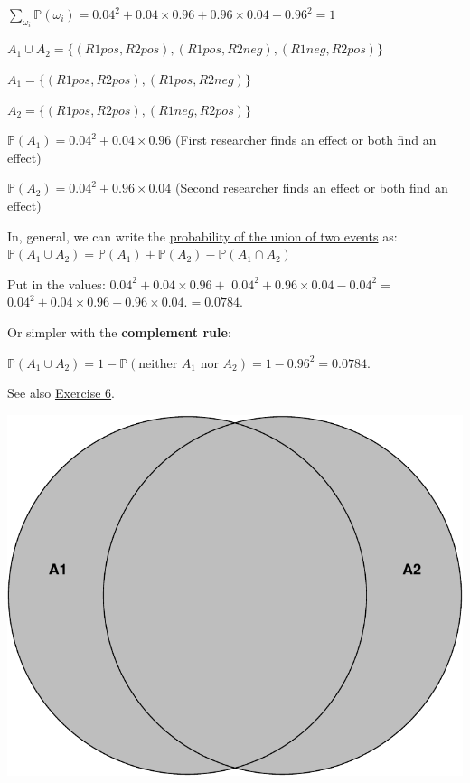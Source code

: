 \documentclass[
]{book}
\newcommand{\pandocbounded}[1]{#1}
\begin{document}
\(\sum_{\omega_i} \mathbb{P}(\omega_i) = 0.04^2 + 0.04 \times 0.96 + 0.96 \times 0.04 + 0.96^2 = 1\)

\(A_1 \cup A_2 = \{ (R1pos, R2pos), (R1pos, R2neg), (R1neg, R2pos)\}\)

\(A_1 = \{ (R1pos, R2pos), (R1pos, R2neg)\}\)

\(A_2 = \{ (R1pos, R2pos), (R1neg, R2pos)\}\)

\(\mathbb{P}(A_1) = 0.04^2 + 0.04 \times 0.96\) (First researcher finds an effect or both find an effect)

\(\mathbb{P}(A_2) = 0.04^2 + 0.96 \times 0.04\) (Second researcher finds an effect or both find an effect)

In, general, we can write the \href{https://en.wikipedia.org/wiki/Probability\#Not_(necessarily)_mutually_exclusive_events}{probability of the union of two events} as:
\(\mathbb{P}(A_1 \cup A_2) = \mathbb{P}(A_1) + \mathbb{P}(A_2) - \mathbb{P}(A_1 \cap A_2)\)

Put in the values:
\(0.04^2 + 0.04 \times 0.96 +\)
\(0.04^2 + 0.96 \times 0.04 - 0.04^2=\)
\(0.04^2 + 0.04 \times 0.96 + 0.96 \times 0.04. = 0.0784\).

Or simpler with the \textbf{complement rule}:

\(\mathbb{P}(A_1 \cup A_2) = 1 - \mathbb{P}(\text{neither }A_1 \text{ nor }A_2) = 1-0.96^2 = 0.0784\).

See also \hyperref[exercise6]{Exercise 6}.

\pandocbounded{\includegraphics[keepaspectratio]{_main_files/figure-latex/unnamed-chunk-10-1.pdf}}
\end{document}
